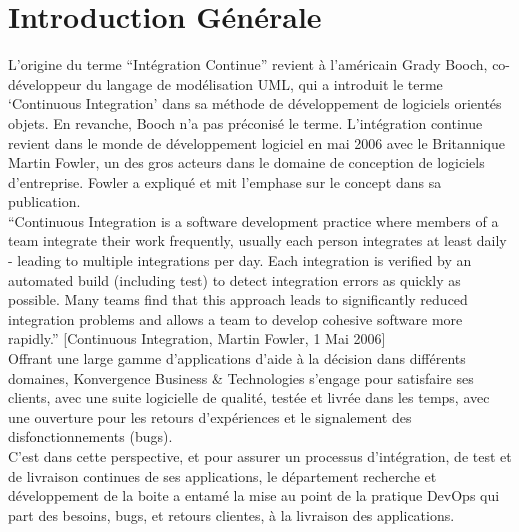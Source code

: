 \chapter*{Introduction Générale}
\begin{spacing}{1.2}

L’origine du terme “Intégration Continue” revient à l’américain Grady Booch\cite{gardBooch}, co-développeur du langage de modélisation UML, qui a introduit le terme ‘Continuous Integration'\cite{continuousIntegration} dans sa méthode de développement de logiciels orientés objets. En revanche, Booch n’a pas préconisé le terme. L’intégration continue revient dans le monde de développement logiciel en mai 2006 avec le Britannique Martin Fowler, un des gros acteurs dans le domaine de conception de logiciels d’entreprise. 
Fowler a expliqué et mit l’emphase sur le concept dans sa publication\cite{martinFowler}.\\

“Continuous Integration is a software development practice where members of a team integrate their work frequently, usually each person integrates at least daily - leading to multiple integrations per day. Each integration is verified by an automated build (including test) to detect integration errors as quickly as possible. Many teams find that this approach leads to significantly reduced integration problems and allows a team to develop cohesive software more rapidly.” [Continuous Integration, Martin Fowler, 1 Mai 2006]\\

Offrant une large gamme d'applications d'aide à la décision dans différents domaines, Konvergence Business \& Technologies s'engage pour satisfaire ses clients, avec une suite logicielle de qualité, testée et livrée dans les temps, avec une ouverture pour les retours d'expériences et le signalement des disfonctionnements (bugs).\\

C'est dans cette perspective, et pour assurer un processus d'intégration, de test et de livraison continues de ses applications, le département recherche et développement de la boite a entamé la mise au point de la pratique DevOps qui part des besoins, bugs, et retours clientes, à la livraison des applications.\\


\end{spacing}
